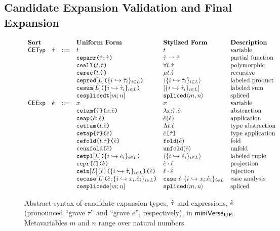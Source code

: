\subsection{Candidate Expansion Validation and Final Expansion}
\begin{figure}
$\begin{array}{lllllll}
\textbf{Sort} & & & \textbf{Uniform Form} & \textbf{Stylized Form} & \textbf{Description}\\
\mathsf{CETyp} & \grave{\tau} & ::= & t & t & \text{variable}\\
&&& \texttt{ceparr}\texttt{(}\grave{\tau}; \grave{\tau}\texttt{)} & \grave{\tau} \rightharpoonup \grave{\tau} & \text{partial function}\\
&&& \texttt{ceall}\texttt{(}t.\grave{\tau}\texttt{)} & \forall t.\grave{\tau} & \text{polymorphic}\\
&&& \texttt{cerec}\texttt{(}t.\grave{\tau}\texttt{)} & \mu t.\grave{\tau} & \text{recursive}\\
&&& \texttt{ceprod}[L]\texttt{(}\{i \hookrightarrow \grave{\tau}_{i}\}_{i \in L}\texttt{)} & \langle \{i \hookrightarrow \grave{\tau}_{i}\}_{i \in L} \rangle & \text{labeled product}\\
&&& \texttt{cesum}[L]\texttt{(}\{i \hookrightarrow \grave{\tau}_{i}\}_{i \in L}\texttt{)} & [\{i \hookrightarrow \grave{\tau}_{i}\}_{i \in L}] & \text{labeled sum}\\
&&& \texttt{cesplicedt}[m; n] & \texttt{spliced}\langle m, n\rangle & \text{spliced}\\
\mathsf{CEExp} & \grave{e} & ::= & x & x & \text{variable}\\
&&& \texttt{celam}\texttt{\{}\grave{\tau}\texttt{\}(}x.\grave{e}\texttt{)} & \lambda x{:}\grave{\tau}.\grave{e} & \text{abstraction}\\
&&& \texttt{ceap}\texttt{(}\grave{e}; \grave{e}\texttt{)} & \grave{e}(\grave{e}) & \text{application}\\
&&& \texttt{cetlam}\texttt{(}t.\grave{e}\texttt{)} & \Lambda t.\grave{e} & \text{type abstraction}\\
&&& \texttt{cetap}\texttt{\{}\grave{\tau}\texttt{\}(}\grave{e}\texttt{)} & \grave{e}\texttt{[}\grave{\tau}\texttt{]} & \text{type application}\\
&&& \texttt{cefold}\texttt{\{}t.\grave{\tau}\texttt{\}(}\grave{e}\texttt{)} & \texttt{fold}(\grave{e}) & \text{fold}\\
&&& \texttt{ceunfold}\texttt{(}\grave{e}\texttt{)} & \texttt{unfold}(\grave{e}) & \text{unfold}\\
&&& \texttt{cetpl}[L]\texttt{(}\{i \hookrightarrow \grave{e}_{i}\}_{i \in L}\texttt{)} & \langle \{i \hookrightarrow \grave{e}_{i}\}_{i \in L}\rangle & \text{labeled tuple}\\
&&& \texttt{cepr}\texttt{[}\ell\texttt{](}\grave{e}\texttt{)} & \grave{e} \cdot \ell & \text{projection}\\
&&& \texttt{cein}[L]\texttt{[}\ell\texttt{]\{}\{i \hookrightarrow \grave{\tau}_{i}\}_{i \in L}\texttt{\}(}\grave{e}\texttt{)} & \ell \cdot \grave{e} & \text{injection}\\
&&& \texttt{cecase}[L]\texttt{(}\grave{e}; \{i \hookrightarrow x_{i}.\grave{e}_{i}\}_{i \in L}\texttt{)} & \texttt{case}~\grave{e}~\{i \hookrightarrow x_{i}.\grave{e}_{i}\}_{i \in L} & \text{case analysis}\\
&&& \texttt{cesplicede}[m; n] & \texttt{spliced}\langle m, n\rangle & \text{spliced}
\end{array}$
\caption[Syntax of candidate expansion types and expressions in $\miniVerseUE$]{Abstract syntax of candidate expansion types, $\grave{\tau}$ and expressions, $\grave{e}$ (pro\-nounced ``grave $\tau$'' and ``grave $e$'', respectively), in $\miniVerseUE$. Metavariables $m$ and $n$ range over natural numbers.}
\label{fig:U-candidate-terms}
\end{figure}

